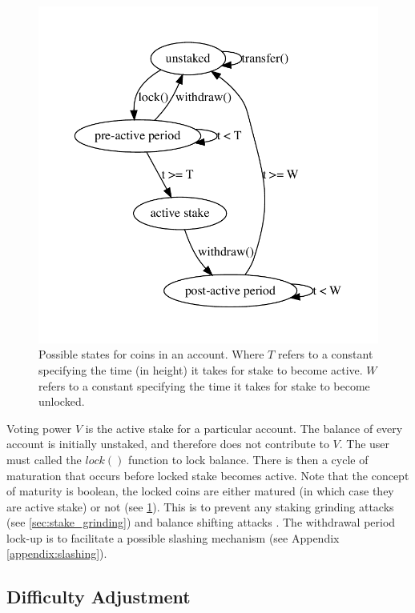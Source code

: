 \documentclass[a4paper]{article}
\begin{document}
\begin{figure}[h]
    \centering
    \includegraphics[scale=0.5]{assets/stake_state}
    \caption{Possible states for coins in an account. Where $T$ refers to a constant specifying the time (in height) it takes for stake to become active. $W$ refers to a constant specifying the time it takes for stake to become unlocked.}
    \label{fig:stake_state}
\end{figure}

Voting power $V$ is the active stake for a particular account. The balance of every account is initially unstaked, and therefore does not contribute to $V$. The user must called the $lock()$ function to lock balance. There is then a cycle of maturation that occurs before locked stake becomes active. Note that the concept of maturity is boolean, the locked coins are either matured (in which case they are active stake) or not (see \cref{fig:stake_state}). This is to prevent any staking grinding attacks (see \cref{sec:stake_grinding}) and balance shifting attacks \cite{nxt_wiki}. The withdrawal period lock-up is to facilitate a possible slashing mechanism (see Appendix \ref{appendix:slashing}).

\subsection{Difficulty Adjustment}
\label{diff_adj}
\end{document}
